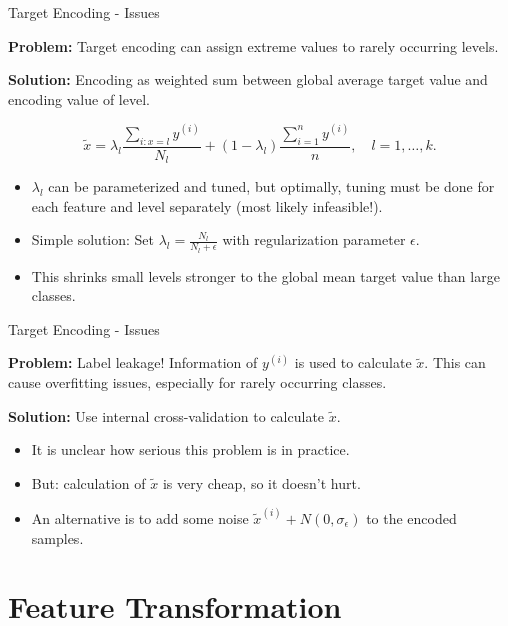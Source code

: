 \documentclass[11pt,compress,t,notes=noshow, xcolor=table]{beamer}
\begin{document}

\begin{vbframe}{Target Encoding - Issues}

\textbf{Problem:} Target encoding can assign extreme values to rarely occurring levels.

\textbf{Solution:} Encoding as weighted sum between global average target value and encoding value of level.

$$\tilde x = \lambda_l\frac{\sum_{i:x=l}y^{(i)}}{N_l} + (1-\lambda_l)\frac{\sum_{i=1}^n y^{(i)}}{n}, \quad l=1,\dots,k.$$

\begin{itemize}
    \item $\lambda_l$ can be parameterized and tuned, but optimally, tuning must be done for each feature and level separately (most likely infeasible!).
    \item Simple solution: Set $\lambda_l=\frac{N_l}{N_l+\epsilon}$ with regularization parameter $\epsilon$.
    \item This shrinks small levels stronger to the global mean target value than large classes.
\end{itemize}



\end{vbframe}


\begin{vbframe}{Target Encoding - Issues}

\textbf{Problem:} Label leakage! Information of $y^{(i)}$ is used to calculate $\tilde x$. This can cause overfitting issues, especially for rarely occurring classes.

\textbf{Solution:} Use internal cross-validation to calculate $\tilde x$.

\begin{itemize}
    \item It is unclear how serious this problem is in practice.
    \item But: calculation of $\tilde x$ is very cheap, so it doesn't hurt.
    \item An alternative is to add some noise $\tilde x^{(i)} + N(0,\sigma_\epsilon)$ to the encoded samples.
\end{itemize}

\end{vbframe}

\section{Feature Transformation}
\end{document}
